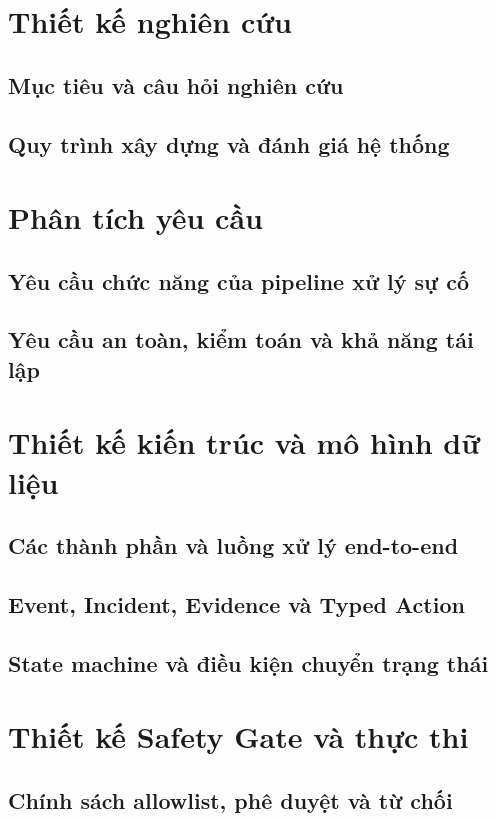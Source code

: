 \section{Thiết kế nghiên cứu}
\subsection{Mục tiêu và câu hỏi nghiên cứu}
\subsection{Quy trình xây dựng và đánh giá hệ thống}

\section{Phân tích yêu cầu}
\subsection{Yêu cầu chức năng của pipeline xử lý sự cố}
\subsection{Yêu cầu an toàn, kiểm toán và khả năng tái lập}

\section{Thiết kế kiến trúc và mô hình dữ liệu}
\subsection{Các thành phần và luồng xử lý end-to-end}
\subsection{Event, Incident, Evidence và Typed Action}
\subsection{State machine và điều kiện chuyển trạng thái}

\section{Thiết kế Safety Gate và thực thi}
\subsection{Chính sách allowlist, phê duyệt và từ chối}
